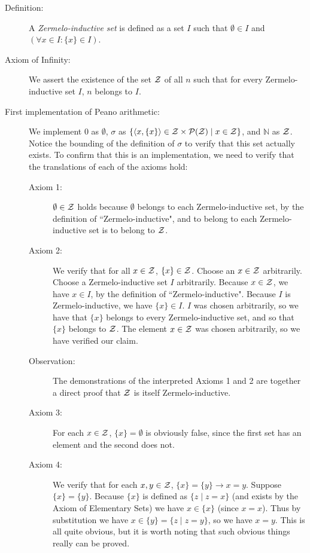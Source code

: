 \documentclass[12pt]{book}
\begin{document}
\begin{description}

\item[Definition:]  A {\em Zermelo-inductive set\/} is defined as a set $I$ such that $\emptyset \in I$  and $(\forall x \in I:\{x\} \in I)$.

\item[Axiom of Infinity:]  We assert the existence of the set $\cal Z$  of all $n$ such that for every Zermelo-inductive set $I$, $n$ belongs to $I$.

\item[First implementation of Peano arithmetic:]  We implement 0 as $\emptyset$, $\sigma$ as $\{\left<x,\{x\}\right> \in {\cal Z} \times {\cal P}({\cal Z})\mid x \in {\cal Z}\}$, and $\mathbb N$ as $\cal Z$.  Notice the bounding of the definition of $\sigma$ to verify that this set actually exists.  To confirm that this is an implementation, we need to verify that the translations of each of the axioms hold:

\begin{description}

\item[Axiom 1:]  $\emptyset \in \cal Z$ holds because $\emptyset$ belongs to each Zermelo-inductive set, by the definition of ``Zermelo-inductive", and to belong to each Zermelo-inductive set is to belong to $\cal Z$.

\item[Axiom 2:]  We verify that for all $x \in \cal Z$, $\{x\} \in \cal Z$.  Choose an $x \in \cal Z$ arbitrarily.  Choose a Zermelo-inductive set $I$ arbitrarily.  Because $x \in \cal Z$, we have $x \in I$, by the definition of ``Zermelo-inductive".  Because $I$ is Zermelo-inductive, we have $\{x\} \in I$.  $I$ was chosen arbitrarily, so we have that $\{x\}$ belongs to every Zermelo-inductive set, and so that $\{x\}$ belongs to $\cal Z$.  The element $x \in \cal Z$ was chosen arbitrarily, so we have verified our claim.

\item[Observation:]  The demonstrations of the interpreted Axioms 1 and 2 are together a direct proof that $\cal Z$ is itself Zermelo-inductive.

\item[Axiom 3:]  For each $x \in \cal Z$, $\{x\} = \emptyset$ is obviously false, since the first set has an element and the second does not.

\item[Axiom 4:]  We verify that for each $x,y \in \cal Z$, $\{x\}=\{y\} \rightarrow x=y$.  Suppose $\{x\}=\{y\}$.  Because $\{x\}$ is defined as $\{z\mid z=x\}$ (and exists by the Axiom of Elementary Sets) we have $x \in \{x\}$ (since $x=x$).  Thus by substitution we have $x \in \{y\} = \{z \mid z=y\}$, so we have $x=y$.  This is all quite obvious, but it is worth noting that such obvious things really can be proved.


\end{description}
\end{description}
\end{document}
